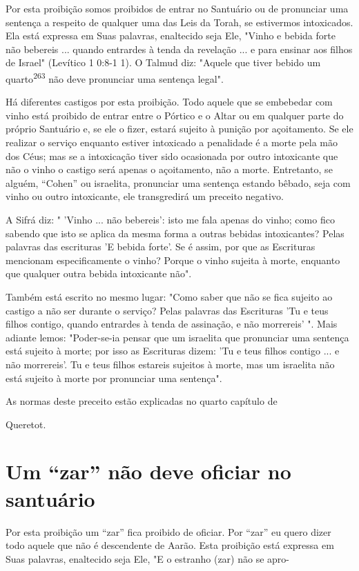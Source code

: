 Por esta proibição somos proibidos de entrar no Santuário ou de
pro­nunciar uma sentença a respeito de qualquer uma das Leis da Torah,
se estiver­mos intoxicados. Ela está expressa em Suas palavras,
enaltecido seja Ele, "Vi­nho e bebida forte não bebereis ... quando
entrardes à tenda da revelação ... e para ensinar aos filhos de Israel"
(Levítico 1 0:8-1 1). O Talmud diz: "Aquele que tiver bebido um
quarto\textsuperscript{263} não deve pronunciar uma sentença legal".

Há diferentes castigos por esta proibição. Todo aquele que se embe­bedar
com vinho está proibido de entrar entre o Pórtico e o Altar ou em
qual­quer parte do próprio Santuário e, se ele o fizer, estará sujeito à
punição por açoitamento. Se ele realizar o serviço enquanto estiver
intoxicado a penalidade é a morte pela mão dos Céus; mas se a
intoxicação tiver sido ocasionada por outro intoxicante que não o vinho
o castigo será apenas o açoitamento, não a morte. Entretanto, se alguém,
``Cohen'' ou israelita, pronunciar uma senten­ça estando bêbado, seja com
vinho ou outro intoxicante, ele transgredirá um preceito negativo.

A Sifrá diz: " 'Vinho ... não bebereis': isto me fala apenas do vinho;
como fico sabendo que isto se aplica da mesma forma a outras bebidas
intoxi­cantes? Pelas palavras das escrituras 'E bebida forte'. Se é
assim, por que as Es­crituras mencionam especificamente o vinho? Porque
o vinho sujeita à morte, enquanto que qualquer outra bebida intoxicante
não".

Também está escrito no mesmo lugar: "Como saber que não se fica sujeito
ao castigo a não ser durante o serviço? Pelas palavras das Escrituras
'Tu e teus filhos contigo, quando entrardes à tenda de assinação, e não
morrereis' ". Mais adiante lemos: "Poder-se-ia pensar que um israelita
que pronunciar uma sentença está sujeito à morte; por isso as Escrituras
dizem: 'Tu e teus filhos con­tigo ... e não morrereis'. Tu e teus filhos
estareis sujeitos à morte, mas um israe­lita não está sujeito à morte
por pronunciar uma sentença".


As normas deste preceito estão explicadas no quarto capítulo de


Queretot.

\section{Um ``zar'' não deve oficiar no santuário}

Por esta proibição um ``zar'' fica proibido de oficiar. Por ``zar'' eu quero
dizer todo aquele que não é descendente de Aarão. Esta proibição está
expressa em Suas palavras, enaltecido seja Ele, "E o estranho (zar) não
se apro-

